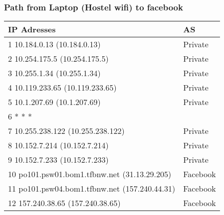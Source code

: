 \subsubsection*{Path from Laptop (Hostel wifi) to facebook}
\begin{table}[!ht]
    \centering
\begin{tabular}{|l|l|}
\hline
\textbf{IP Adresses}                                                        & \textbf{AS}                                                           \\ \hline
1  10.184.0.13 (10.184.0.13)                                                & Private                                                               \\ \hline
2  10.254.175.5 (10.254.175.5)                                              & Private                                                               \\ \hline
3  10.255.1.34 (10.255.1.34)                                                & Private                                                               \\ \hline
4  10.119.233.65 (10.119.233.65)                                            & Private                                                               \\ \hline
5  10.1.207.69 (10.1.207.69)                                                & Private                                                               \\ \hline
6  * * *                                                                    &                                                                       \\ \hline
7  10.255.238.122 (10.255.238.122)                                          & Private                                                               \\ \hline
8  10.152.7.214 (10.152.7.214)                                              & Private                \\ \hline
9  10.152.7.233 (10.152.7.233)                                              & Private                \\ \hline
10  po101.psw01.bom1.tfbnw.net (31.13.29.205)                               & Facebook               \\ \hline
11  po101.psw04.bom1.tfbnw.net (157.240.44.31)                              & Facebook               \\ \hline
12  157.240.38.65 (157.240.38.65)                                           & Facebook\\ \hline
\end{tabular}
\end{table}
